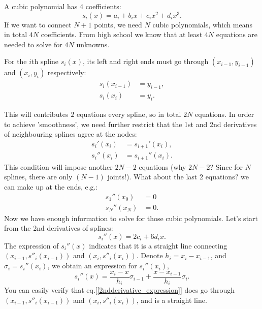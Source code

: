 \documentclass[paper=a4,fontsize=11pt]{scrartcl} %
\begin{document}
A cubic polynomial has 4 coefficients:
\begin{equation}\label{3poly}
s_i(x) = a_i + b_ix + c_ix^2 + d_ix^3.
\end{equation}
If we want to connect $N+1$ points, we need $N$ cubic polynomials, which means in total $4N$ coefficients. From high school we know that at least $4N$ equations are needed to solve for $4N$ unknowns. 

For the $i$th spline $s_i(x)$, its left and right ends must go through $(x_{i-1}, y_{i-1})$ and $(x_i, y_i)$ respectively:
\begin{equation}\label{spline_value_restriction}
\begin{split}
s_i(x_{i-1}) & = y_{i-1}, \\
s_i(x_i) & = y_{i}.
\end{split}
\end{equation}

This will contributes $2$ equations every spline, so in total $2N$ equations. In order to achieve 'smoothness', we need further restrict that the 1st and 2nd derivatives of neighbouring splines agree at the nodes:
\begin{equation}\label{spline_dev_restriction}
\begin{split}
s_i'(x_{i}) & = s_{i+1}'(x_{i}), \\
s_i''(x_{i}) & = s_{i+1}''(x_{i}).
\end{split}
\end{equation}
This condition will impose another $2N-2$ equations (why $2N-2$? Since for $N$ splines, there are only $(N-1)$ joints!). What about the last 2 equations? we can make up at the ends, e.g.:
\begin{equation}\label{derivative_end}
\begin{split}
s_1''(x_{0}) & = 0 \\
s_{N}''(x_{N}) & = 0.
\end{split}
\end{equation}
Now we have enough information to solve for those cubic polynomials. Let's start from the 2nd derivatives of splines:
\begin{equation}\label{3poly_2ndderivative}
s_i''(x) = 2 c_i + 6d_ix.
\end{equation}
The expression of $s_i''(x)$ indicates that it is a straight line connecting $(x_{i-1}, s''_{i}(x_{i-1}))$ and $(x_i, s''_i(x_{i}))$. Denote $h_i = x_i - x_{i-1}$, and $\sigma_i = s_i''(x_i)$, we obtain an expression for $s_i''(x_i)$,
\begin{equation}\label{2ndderivative_expression}
s_i''(x) = \frac{x_i - x}{h_i}\sigma_{i-1} + \frac{x - x_{i-1}}{h_i}\sigma_{i}.
\end{equation}
You can easily verify that eq.[\ref{2ndderivative_expression}] does go through $(x_{i-1}, s''_{i}(x_{i-1}))$ and $(x_i, s''_i(x_{i}))$, and is a straight line.
\end{document}
